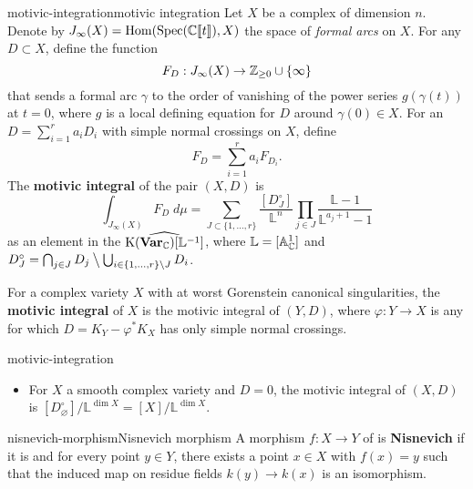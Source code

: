 \begin{topic}{motivic-integration}{motivic integration}
    Let $X$ be a  complex  of dimension $n$. Denote by $J_\infty(X) = \operatorname{Hom}(\operatorname{Spec}(\mathbb{C} \llbracket t \rrbracket), X)$ the space of \textit{formal arcs} on $X$. For any  $D \subset X$, define the function
    \[ F_D : J_\infty(X) \to \mathbb{Z}_{\ge 0} \cup \{ \infty \} \]
    that sends a formal arc $\gamma$ to the order of vanishing of the power series $g(\gamma(t))$ at $t = 0$, where $g$ is a local defining equation for $D$ around $\gamma(0) \in X$. For an  $D = \sum_{i = 1}^{r} a_i D_i$ with simple normal crossings on $X$, define
    \[ F_D = \sum_{i = 1}^{r} a_i F_{D_i} . \]
    The \textbf{motivic integral} of the pair $(X, D)$ is
    \[ \int_{J_\infty(X)} F_D \; d \mu = \sum_{J \subset \{ 1, \ldots, r \}} \frac{[D_J^\circ]}{\mathbb{L}^n} \prod_{j \in J} \frac{\mathbb{L} - 1}{\mathbb{L}^{a_j + 1} - 1} \]
    as an element in the    $\widehat{\textup{K}(\textbf{Var}_{\mathbb{C}})[\mathbb{L}^{-1}]}$, where $\mathbb{L} = [\mathbb{A}^1_{\mathbb{C}}]$ and $D_J^\circ = \bigcap_{j \in J} D_j \mathbin{\big\backslash} \bigcup_{i \in \{ 1, \ldots, r \} \setminus J} D_i$.

    For a complex variety $X$ with at worst Gorenstein canonical singularities, the \textbf{motivic integral} of $X$ is the motivic integral of $(Y, D)$, where $\varphi : Y \to X$ is any  for which $D = K_Y - \varphi^* K_X$ has only simple normal crossings.
\end{topic}

\begin{example}{motivic-integration}
    \begin{itemize}
        \item For $X$ a smooth complex variety and $D = 0$, the motivic integral of $(X, D)$ is $[D_\varnothing^\circ] / \mathbb{L}^{\dim X} = [X] / \mathbb{L}^{\dim X}$.
    \end{itemize}
\end{example}

\begin{topic}{nisnevich-morphism}{Nisnevich morphism}
    A morphism $f : X \to Y$ of  is \textbf{Nisnevich} if it is  and for every point $y \in Y$, there exists a point $x \in X$ with $f(x) = y$ such that the induced map on residue fields $k(y) \to k(x)$ is an isomorphism.
\end{topic}

